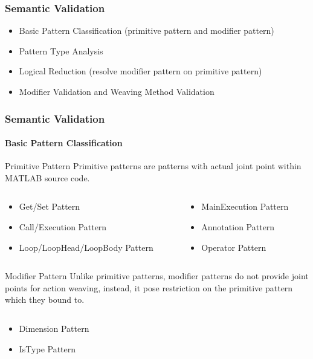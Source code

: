 \documentclass[10pt]{beamer}
\begin{document}
\begin{frame}
\frametitle{Semantic Validation}
\begin{itemize}
    \item Basic Pattern Classification (primitive pattern and modifier pattern)
    \item Pattern Type Analysis
    \item Logical Reduction (resolve modifier pattern on primitive pattern)
    \item Modifier Validation and Weaving Method Validation
\end{itemize}
\end{frame}

\begin{frame}
\frametitle{Semantic Validation}
\framesubtitle{Basic Pattern Classification}
\begin{block}{Primitive Pattern}
Primitive patterns are patterns with actual joint point within MATLAB
source code.
\end{block}

\begin{columns}
    \begin{column}{0.5\textwidth}
    \begin{itemize}
        \item Get/Set Pattern
        \item Call/Execution Pattern
        \item Loop/LoopHead/LoopBody Pattern
    \end{itemize}    
    \end{column}
    
    \begin{column}{0.5\textwidth}
    \begin{itemize}
        \item MainExecution Pattern
        \item Annotation Pattern
        \item Operator Pattern
    \end{itemize}
    \end{column}
\end{columns}


\begin{block}{Modifier Pattern}
Unlike primitive patterns, modifier patterns do not provide joint points for
action weaving, instead, it pose restriction on the primitive pattern which
they bound to.
\end{block}

\begin{columns}
    \begin{column}{0.5\textwidth}
    \begin{itemize}
        \item Dimension Pattern
        \item IsType Pattern
    \end{itemize}    
    \end{column}
    

\end{columns}
\end{frame}
\end{document}

